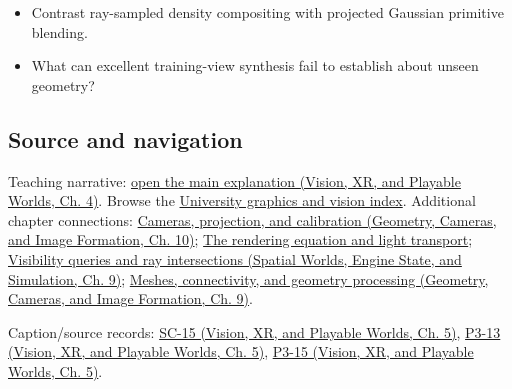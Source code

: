 \begin{itemize}
\tightlist
\item
  Contrast ray-sampled density compositing with projected Gaussian primitive blending.
\item
  What can excellent training-view synthesis fail to establish about unseen geometry?
\end{itemize}

\subsection{Source and navigation}\label{appendix-c5b332e400e7-source-and-navigation}

Teaching narrative: \href{../07-Vision-XR-and-Playable-Worlds/main.pdf\#nameddest=04-visual-computing-ii-ch034-learned-representations-of-3d-shape-and-scenes}{open the main explanation (Vision, XR, and Playable Worlds, Ch. 4)}. Browse the \hyperref[appendix-a6d556a4ef50-university-graphics-vision-and-photography---independent-series]{University graphics and vision index}. Additional chapter connections: \href{../03-Geometry-Cameras-and-Image-Formation/main.pdf\#nameddest=03-visual-computing-i-ch003-cameras-projection-and-calibration}{Cameras, projection, and calibration (Geometry, Cameras, and Image Formation, Ch. 10)}; \hyperref[03-visual-computing-i-ch007-the-rendering-equation-and-light-transport]{The rendering equation and light transport}; \href{../05-Spatial-Worlds-Engine-State-and-Simulation/main.pdf\#nameddest=04-visual-computing-ii-ch028-visibility-queries-and-ray-intersections-1}{Visibility queries and ray intersections (Spatial Worlds, Engine State, and Simulation, Ch. 9)}; \href{../03-Geometry-Cameras-and-Image-Formation/main.pdf\#nameddest=03-visual-computing-i-ch002-meshes-connectivity-and-geometry-processing}{Meshes, connectivity, and geometry processing (Geometry, Cameras, and Image Formation, Ch. 9)}.

Caption/source records: \href{../07-Vision-XR-and-Playable-Worlds/main.pdf\#nameddest=04-visual-computing-ii-ch036-sc-15---stanford-cs231n-deep-learning-for-computer-vision-spring-2025-lecture-15-3d-vision}{SC-15 (Vision, XR, and Playable Worlds, Ch. 5)}, \href{../07-Vision-XR-and-Playable-Worlds/main.pdf\#nameddest=04-visual-computing-ii-ch036-p3-13---curves-and-surfaces}{P3-13 (Vision, XR, and Playable Worlds, Ch. 5)}, \href{../07-Vision-XR-and-Playable-Worlds/main.pdf\#nameddest=04-visual-computing-ii-ch036-p3-15---ray-tracing}{P3-15 (Vision, XR, and Playable Worlds, Ch. 5)}.

